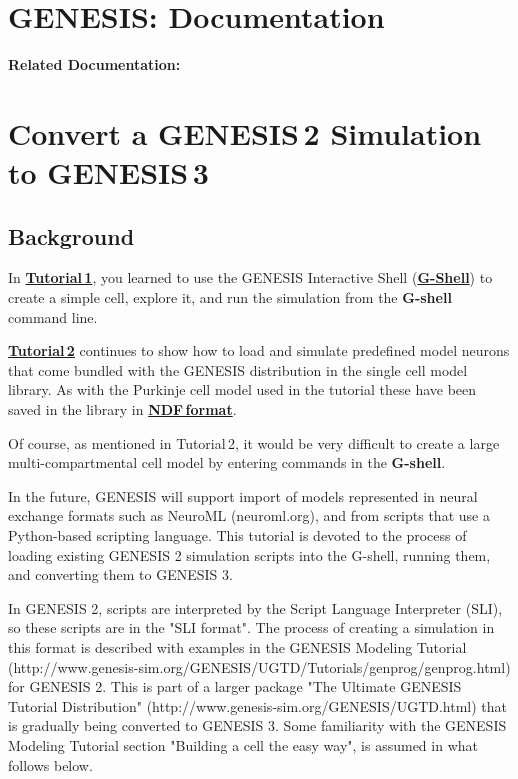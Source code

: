 \documentclass[12pt]{article}
\begin{document}
\section*{GENESIS: Documentation}

{\bf Related Documentation:}

\section*{Convert a GENESIS\,2 Simulation to GENESIS\,3}

\subsection*{Background}

In \href{../tutorial1/tutorial1.tes}{\bf Tutorial\,1}, you learned to use the GENESIS Interactive Shell (\href{../gshell/gshell.tex}{\bf G-Shell})
to create a simple cell, explore it, and run the simulation from the
{\bf G-shell} command line.

\href{../tutorial2/tutorial2.tex}{\bf Tutorial\,2} continues to show how to load and simulate predefined model
neurons that come bundled with the GENESIS distribution in the single
cell model library.  As with the Purkinje cell model used in the
tutorial these have been saved in the library in \href{../ndf-file-format/ndf-file-format.tex}{\bf NDF\,format}.

Of course, as mentioned in Tutorial\,2, it would be very difficult to create a large multi-compartmental
cell model by entering commands in the {\bf G-shell}.

In the future, GENESIS will support import of models represented in
neural exchange formats such as NeuroML (neuroml.org), and from scripts
that use a Python-based scripting language.  This tutorial is devoted
to the process of loading existing GENESIS 2 simulation scripts into
the G-shell, running them, and converting them to GENESIS 3.

In GENESIS 2, scripts are interpreted by the Script Language
Interpreter (SLI), so these scripts are in the "SLI format".  The
process of creating a simulation in this format is described with
examples in the GENESIS Modeling Tutorial
(http://www.genesis-sim.org/GENESIS/UGTD/Tutorials/genprog/genprog.html)
for GENESIS 2.  This is part of a larger package "The Ultimate GENESIS
Tutorial Distribution" (http://www.genesis-sim.org/GENESIS/UGTD.html)
that is gradually being converted to GENESIS 3.  Some familiarity with
the GENESIS Modeling Tutorial section "Building a cell the easy way",
is assumed in what follows below.
\end{document}

